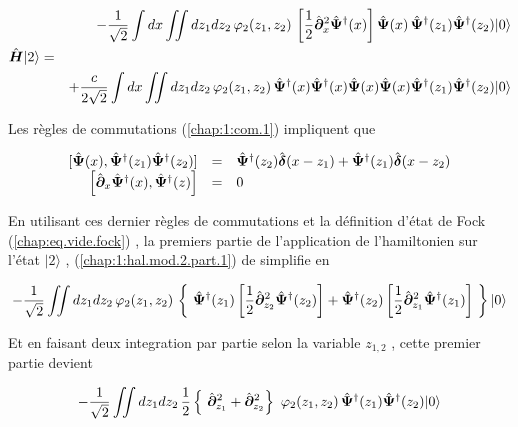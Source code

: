 \begin{eqnarray}
	& & - \frac{1}{ \sqrt{2}} \int dx \iint dz_1 dz_2 \, \varphi_2(z_1, z_2) \,	\left [\frac{1}{2}\hat{\bm{\partial}}_x^2 \hat{\bm{\Psi}}^\dag(x)\right ] \hat{\bm{\Psi}}(x)\,  \hat{\bm{\Psi}}^\dag(z_1)\hat{\bm{\Psi}}^\dag(z_2) \vert 0 \rangle \label{chap:1:hal.mod.2.part.1}\\
	\hat{\bm{H}}\vert 2 \rangle & = & \nonumber \\
	& & +\frac{c}{ 2\sqrt{2}} \int dx  \iint dz_1 dz_2 \,  \varphi_2(z_1, z_2) 	\, \hat{\bm{\Psi}}^\dag(x)\hat{\bm{\Psi}}^\dag(x) \hat{\bm{\Psi}}(x)\hat{\bm{\Psi}}(x)  \hat{\bm{\Psi}}^\dag(z_1) \hat{\bm{\Psi}}^\dag(z_2) \vert 0 \rangle \label{chap:1:hal.mod.2.part.2} 
\end{eqnarray}

Les règles de commutations (\ref{chap:1:com.1}) impliquent que 

\begin{eqnarray}
	\left . \begin{array}{rcl}
		[ \hat{\bm{\Psi}}(x),  \hat{\bm{\Psi}}^\dag(z_1) \hat{\bm{\Psi}}^\dag(z_2)  ]  &=&  \hat{\bm{\Psi}}^\dag(z_2)  \hat{\bm{\delta}}(x-z_1) +  \hat{\bm{\Psi}}^\dag(z_1) \hat{\bm{\delta}}(x-z_2)  \\
		\left [ \hat{\bm{\partial}}_x\hat{\bm{\Psi}}^\dag(x),  \hat{\bm{\Psi}}^\dag(z) \right ]   & =  & 0 
	\end{array} \right . \label{chap:1:2.part.com.2}
\end{eqnarray}


En utilisant ces dernier règles de commutations et la définition d'état de Fock (\ref{chap:eq.vide.fock}) , la premiers partie de l'application de l'hamiltonien sur l'état $\vert 2  \rangle$ , (\ref{chap:1:hal.mod.2.part.1}) de simplifie en 

\begin{eqnarray}
	 - \frac{1}{ \sqrt{2}} \iint dz_1 dz_2 \, \varphi_2(z_1, z_2) \,	 \left \{ \operator{\Psi}^\dag(z_1) \left [\frac{1}{2}\operator{\partial}_{z_2}^2 \operator{\Psi}^\dag(z_2) \right ] + \operator{\Psi}^\dag(z_2) \left [\frac{1}{2}\operator{\partial}_{z_1}^2 \operator{\Psi}^\dag(z_1)  \right]  \right \}  \vert 0 \rangle 	
\end{eqnarray}

Et en faisant deux integration par partie selon la variable $z_{1,2}$ , cette premier partie devient

\begin{eqnarray}
	 - \frac{1}{ \sqrt{2}}  \iint dz_1 dz_2  \,  \frac{1}{2} \left \{ \operator{\partial}_{z_1}^2 +  \operator{\partial}_{z_2}^2 \right\} \varphi_2(z_1, z_2) \,	 \operator{\Psi}^\dag(z_1) \operator{\Psi}^\dag(z_2) \vert 0 \rangle \label{chap:1:hal.mod.2.part.1.1}	
\end{eqnarray}

